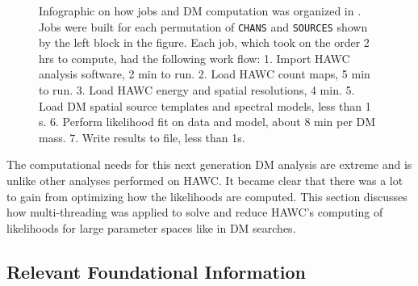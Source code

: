 \begin{figure}[h]
    \caption{Infographic on how jobs and DM computation was organized in . Jobs were built for each permutation of \texttt{CHANS} and \texttt{SOURCES} shown by the left block in the figure. Each job, which took on the order 2 hrs to compute, had the following work flow: 1. Import HAWC analysis software, 2 min to run. 2. Load HAWC count maps, 5 min to run. 3. Load HAWC energy and spatial resolutions, 4 min. 5. Load DM spatial source templates and spectral models, less than 1 s. 6. Perform likelihood fit on data and model, about 8 min per DM mass. 7. Write results to file, less than 1s.}
    \label{fig:mtd_gd_workflow}
\end{figure}


The computational needs for this next generation DM analysis are extreme and is unlike other analyses performed on HAWC.
It became clear that there was a lot to gain from optimizing how the likelihoods are computed.
This section discusses how multi-threading was applied to solve and reduce HAWC's computing of likelihoods for large parameter spaces like in DM searches.

\subsection{Relevant Foundational Information}\label{sec:mtd_foundation}

